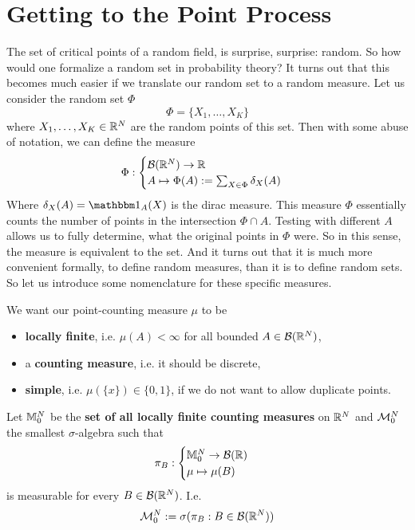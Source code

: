 \section{Getting to the Point Process}

The set of critical points of a random field, is surprise, surprise: random.
So how would one formalize a random set in probability theory? It turns
out that this becomes much easier if we translate our random set to a random
measure. Let us consider the random set \(\Phi\)
\[
	\Phi = \{ X_1, \dots, X_K\}
\]
where \(X_1,\dots, X_K\in\mathbb{R}^N\) are the random points of this set. Then with some
abuse of notation, we can define the measure
\[
	\Phi :
	\begin{cases}
		\mathcal{B}(\mathbb{R}^N) \to \mathbb{R} \\
		A \mapsto \Phi(A):= \sum_{X\in \Phi}\delta_X(A) 
	\end{cases}
\]
Where \(\delta_X(A)=\ind_A(X)\) is the dirac measure. This measure \(\Phi\)
essentially counts the number of points in the intersection \(\Phi\cap A\).
Testing with different \(A\) allows us to fully determine, what
the original points in \(\Phi\) were. So in this sense, the measure is
equivalent to the set. And it turns out that it is much more convenient
formally, to define random measures, than it is to define random sets.
So let us introduce some nomenclature for these specific measures.

We want our point-counting measure \(\mu\) to be
\begin{itemize}
	\item \textbf{locally finite}, i.e. \(\mu(A) < \infty\) for all bounded
	\(A\in\mathcal{B}(\mathbb{R}^N)\),
	\item a \textbf{counting measure}, i.e. it should be discrete,
	\item \textbf{simple}, i.e. \(\mu(\{x\})\in\{0,1\}\), if we do not want
	to allow duplicate points.
\end{itemize}
Let \(\mathbb{M}^{N}_0\) be the \textbf{set of all locally finite counting measures}
on \(\mathbb{R}^N\) and \(\mathcal{M}^{N}_0\) the smallest \(\sigma\)-algebra
such that
\[
	\pi_B : \begin{cases}
		\mathbb{M}^{N}_0 \to \mathcal{B}(\mathbb{R})\\
		\mu \mapsto \mu(B)
	\end{cases}
\]
is measurable for every \(B\in\mathcal{B}(\mathbb{R}^N)\). I.e.
\[
	\mathcal{M}^{N}_0 := \sigma(\pi_B : B\in\mathcal{B}(\mathbb{R}^N))
\]

